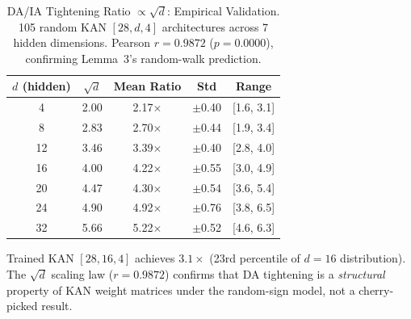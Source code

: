 \begin{table}[t]
\centering
\caption{DA/IA Tightening Ratio $\propto \sqrt{d}$: Empirical Validation.
105 random KAN $[28,d,4]$ architectures across 7 hidden dimensions.
Pearson $r = 0.9872$ ($p = 0.0000$),
confirming Lemma~3's random-walk prediction.}
\label{tab:da_scaling}
\small
\begin{tabular}{@{}ccccc@{}}
\toprule
\textbf{$d$ (hidden)} & \textbf{$\sqrt{d}$} & \textbf{Mean Ratio} &
\textbf{Std} & \textbf{Range} \\
\midrule
  4 & 2.00 & 2.17$\times$ & $\pm$0.40 & [1.6, 3.1] \\
  8 & 2.83 & 2.70$\times$ & $\pm$0.44 & [1.9, 3.4] \\
  12 & 3.46 & 3.39$\times$ & $\pm$0.40 & [2.8, 4.0] \\
  16 & 4.00 & 4.22$\times$ & $\pm$0.55 & [3.0, 4.9] \\
  20 & 4.47 & 4.30$\times$ & $\pm$0.54 & [3.6, 5.4] \\
  24 & 4.90 & 4.92$\times$ & $\pm$0.76 & [3.8, 6.5] \\
  32 & 5.66 & 5.22$\times$ & $\pm$0.52 & [4.6, 6.3] \\
\bottomrule
\end{tabular}
\vspace{2pt}
{\scriptsize Trained KAN $[28,16,4]$ achieves $3.1\times$ (23rd percentile of
$d{=}16$ distribution). The $\sqrt{d}$ scaling law ($r = 0.9872$)
confirms that DA tightening is a \textit{structural} property of KAN weight
matrices under the random-sign model, not a cherry-picked result.}
\end{table}